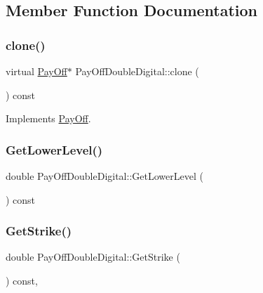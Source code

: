 \subsection{Member Function Documentation}
\hypertarget{classPayOffDoubleDigital_a27dab8d62e8262d190853b0a4eea3bf3}{}\label{classPayOffDoubleDigital_a27dab8d62e8262d190853b0a4eea3bf3} 
\subsubsection{\texorpdfstring{clone()}{clone()}}
{\footnotesize\ttfamily virtual \hyperlink{classPayOff}{Pay\+Off}$\ast$ Pay\+Off\+Double\+Digital\+::clone (\begin{DoxyParamCaption}{ }\end{DoxyParamCaption}) const\hspace{0.3cm}{\ttfamily [virtual]}}



Implements \hyperlink{classPayOff_ad8194d5b82247ae89c25c515f0ba806a}{Pay\+Off}.

\hypertarget{classPayOffDoubleDigital_aa99991381645852dbb7ce2ab1a622699}{}\label{classPayOffDoubleDigital_aa99991381645852dbb7ce2ab1a622699} 
\subsubsection{\texorpdfstring{Get\+Lower\+Level()}{GetLowerLevel()}}
{\footnotesize\ttfamily double Pay\+Off\+Double\+Digital\+::\+Get\+Lower\+Level (\begin{DoxyParamCaption}{ }\end{DoxyParamCaption}) const}

\hypertarget{classPayOffDoubleDigital_a58e92fda1c78721ff68494aafd42616e}{}\label{classPayOffDoubleDigital_a58e92fda1c78721ff68494aafd42616e} 
\subsubsection{\texorpdfstring{Get\+Strike()}{GetStrike()}}
{\footnotesize\ttfamily double Pay\+Off\+Double\+Digital\+::\+Get\+Strike (\begin{DoxyParamCaption}{ }\end{DoxyParamCaption}) const\hspace{0.3cm}{\ttfamily [inline]}, {\ttfamily [virtual]}}



